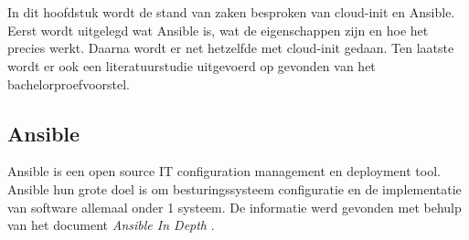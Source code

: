 \chapter{}
\label{ch:stand-van-zaken}






In dit hoofdstuk wordt de stand van zaken besproken van cloud-init en Ansible. Eerst wordt uitgelegd wat Ansible is, wat de eigenschappen zijn en hoe het precies werkt. Daarna wordt er net hetzelfde met cloud-init gedaan. Ten laatste wordt er ook een literatuurstudie uitgevoerd op gevonden van het bachelorproefvoorstel.

\section{Ansible}
Ansible is een open source IT configuration management en deployment tool. Ansible hun grote doel is om besturingssysteem configuratie en de implementatie van software allemaal onder 1 systeem. De informatie werd gevonden met behulp van het document \textit{Ansible In Depth} \autocite{ansibleid}.

